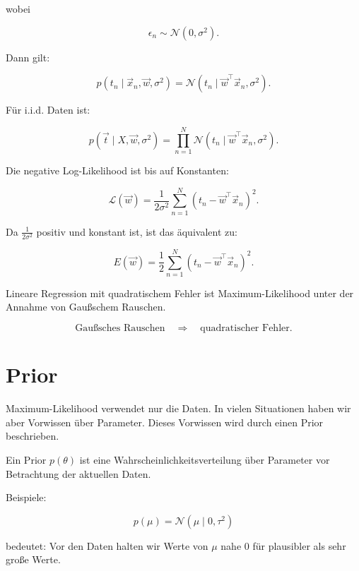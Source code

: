 wobei

\[
    \epsilon_n
    \sim
    \mathcal{N}(0,\sigma^2).
\]

Dann gilt:

\[
    p(t_n \mid \vec{x}_n,\vec{w},\sigma^2)
    =
    \mathcal{N}
    \left(
        t_n
        \mid
        \vec{w}^{\top}\vec{x}_n,
        \sigma^2
    \right).
\]

Für i.i.d. Daten ist:

\[
    p(\vec{t} \mid X,\vec{w},\sigma^2)
    =
    \prod_{n=1}^{N}
    \mathcal{N}
    \left(
        t_n
        \mid
        \vec{w}^{\top}\vec{x}_n,
        \sigma^2
    \right).
\]

Die negative Log-Likelihood ist bis auf Konstanten:

\[
    \mathcal{L}(\vec{w})
    =
    \frac{1}{2\sigma^2}
    \sum_{n=1}^{N}
    \left(
        t_n
        -
        \vec{w}^{\top}\vec{x}_n
    \right)^2.
\]

Da \(\frac{1}{2\sigma^2}\) positiv und konstant ist, ist das äquivalent zu:

\[
    E(\vec{w})
    =
    \frac{1}{2}
    \sum_{n=1}^{N}
    \left(
        t_n
        -
        \vec{w}^{\top}\vec{x}_n
    \right)^2.
\]

\begin{conceptbox}
Lineare Regression mit quadratischem Fehler ist Maximum-Likelihood unter der Annahme von Gaußschem Rauschen.

\[
    \text{Gaußsches Rauschen}
    \quad
    \Longrightarrow
    \quad
    \text{quadratischer Fehler}.
\]
\end{conceptbox}

\section{Prior}

Maximum-Likelihood verwendet nur die Daten.
In vielen Situationen haben wir aber Vorwissen über Parameter.
Dieses Vorwissen wird durch einen Prior beschrieben.

\begin{definitionbox}
Ein Prior \(p(\theta)\) ist eine Wahrscheinlichkeitsverteilung über Parameter vor Betrachtung der aktuellen Daten.
\end{definitionbox}

Beispiele:

\[
    p(\mu)
    =
    \mathcal{N}(\mu \mid 0,\tau^2)
\]

bedeutet:
Vor den Daten halten wir Werte von \(\mu\) nahe \(0\) für plausibler als sehr große Werte.

